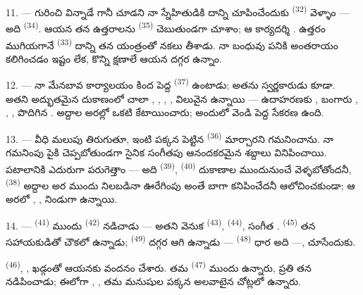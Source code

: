 11. ---  గురించి విన్నాడే గానీ చూడని నా స్నేహితుడికి దాన్ని
చూపించేందుకు  \textsuperscript{(32)} వెళ్ళాం — అది
 \textsuperscript{(34)}. ఆయన తన ఉత్తరాలను 
\textsuperscript{(35)} చెబుతుండగా చూశాం; ఆ కార్యదర్శి . ఉత్తరం
ముగియగానే  \textsuperscript{(33)} దాన్ని తన యంత్రంతో నకలు తీశాడు. నా బంధువు
పనికి అంతరాయం కలిగించడం ఇష్టం లేక, కొన్ని క్షణాలే ఆయన దగ్గర ఉన్నాం.

12. --- నా మేనబావ కార్యాలయం కింద పెద్ద 
\textsuperscript{(37)} ఉంటాడు; అతను స్వర్ణకారుడు కూడా. అతని అద్భుతమైన దుకాణంలో చాలా
, , ,
, విలువైన  ఉన్నాయి — ఉదాహరణకు
, బంగారు , ,
,  పొదిగిన . అద్దాల అరల్లో ఒకటి
 కేటాయించారు; అందులో వెండి  పెద్ద సేకరణ
ఉంది.

13. --- వీధి మలుపు తిరుగుతూ, ఇంటి  పక్కన పెట్టిన 
\textsuperscript{(36)} మార్చారని గమనించాను. నా గమనింపు పైకి చెప్పబోతుండగా సైనిక సంగీతపు
ఆనందకరమైన శబ్దాలు వినిపించాయి. పటాలానికి ఎదురుగా పరుగెత్తాం — అది
 \textsuperscript{(39)}, 
\textsuperscript{(40)} దుకాణాల ముందునుంచే వెళ్ళబోతోందనీ, 
\textsuperscript{(38)} అద్దాల అర ముందు నిలబడినా ఊరేగింపు అంతే బాగా కనిపించేదనీ
ఆలోచించకుండా; ఆ అరలో , ,
 నిండుగా ఉన్నాయి.

\VUsaut{3.0mm}

14. ---  \textsuperscript{(41)} ముందు 
\textsuperscript{(42)} నడిచాడు — అతని వెనుక 
\textsuperscript{(43)},  \textsuperscript{(44)}, సంగీత
.  \textsuperscript{(45)} తన సహాయకుడితో చౌకలో ఉన్నాడు;
 \textsuperscript{(49)} దగ్గర ఆగి ఉన్నాడు — 
\textsuperscript{(48)} ధార అది —,  చూసేందుకు.

 \textsuperscript{(46)}, ,
 ఖడ్గంతో ఆయనకు వందనం చేశారు.  తమ
 \textsuperscript{(47)} ముందు ఉన్నారు, ప్రతి  తన
 నడిపించాడు; ఈలోగా ,
,  తమ మనుషుల పక్కన అలవాటైన చోట్లలో
ఉన్నారు.


